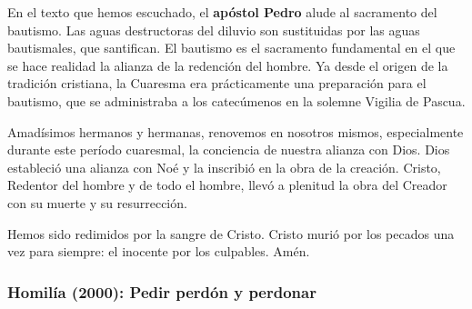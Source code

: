 \begin{body}
En el texto que hemos escuchado, el \textbf{apóstol Pedro} alude al sacramento del bautismo. Las aguas destructoras del diluvio son sustituidas por las aguas bautismales, que santifican. El bautismo es el sacramento fundamental en el que se hace realidad la alianza de la redención del hombre. Ya desde el origen de la tradición cristiana, la Cuaresma era prácticamente una preparación para el bautismo, que se administraba a los catecúmenos en la solemne Vigilia de Pascua.

Amadísimos hermanos y hermanas, renovemos en nosotros mismos, especialmente durante este período cuaresmal, la conciencia de nuestra alianza con Dios. Dios estableció una alianza con Noé y la inscribió en la obra de la creación. Cristo, Redentor del hombre y de todo el hombre, llevó a plenitud la obra del Creador con su muerte y su resurrección.

Hemos sido redimidos por la sangre de Cristo. Cristo murió por los pecados una vez para siempre: el inocente por los culpables. Amén.
\end{body}

\subsubsection{Homilía (2000): Pedir perdón y perdonar}





